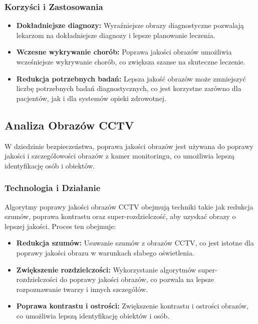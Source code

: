 \documentclass[10pt]{article}
\begin{document}
\subsubsection*{Korzyści i Zastosowania}

\begin{itemize}
    \item \textbf{Dokładniejsze diagnozy:} Wyraźniejsze obrazy diagnostyczne pozwalają lekarzom na dokładniejsze diagnozy i lepsze planowanie leczenia.
    \item \textbf{Wczesne wykrywanie chorób:} Poprawa jakości obrazów umożliwia wcześniejsze wykrywanie chorób, co zwiększa szanse na skuteczne leczenie.
    \item \textbf{Redukcja potrzebnych badań:} Lepsza jakość obrazów może zmniejszyć liczbę potrzebnych badań diagnostycznych, co jest korzystne zarówno dla pacjentów, jak i dla systemów opieki zdrowotnej.
\end{itemize}

\subsection*{Analiza Obrazów CCTV}

W dziedzinie bezpieczeństwa, poprawa jakości obrazów jest używana do poprawy jakości i szczegółowości obrazów z kamer monitoringu, co umożliwia lepszą identyfikację osób i obiektów.

\subsubsection*{Technologia i Działanie}

Algorytmy poprawy jakości obrazów CCTV obejmują techniki takie jak redukcja szumów, poprawa kontrastu oraz super-rozdzielczość, aby uzyskać obrazy o lepszej jakości. Proces ten obejmuje:

\begin{itemize}
    \item \textbf{Redukcja szumów:} Usuwanie szumów z obrazów CCTV, co jest istotne dla poprawy jakości obrazu w warunkach słabego oświetlenia.
    \item \textbf{Zwiększenie rozdzielczości:} Wykorzystanie algorytmów super-rozdzielczości do poprawy jakości obrazów, co pozwala na lepsze rozpoznawanie twarzy i innych szczegółów.
    \item \textbf{Poprawa kontrastu i ostrości:} Zwiększenie kontrastu i ostrości obrazów, co umożliwia lepszą identyfikację obiektów i osób.
\end{itemize}
\end{document}
